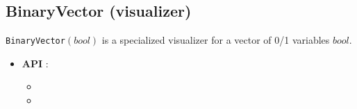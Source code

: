 \subsection{BinaryVector (visualizer)}\label{binaryvector:visu}\hypertarget{binaryvector:visu}{}
\begin{notedef}
  \texttt{BinaryVector}$(bool)$  is a specialized visualizer for a vector of 0/1 variables $bool$.
\end{notedef}

\begin{itemize}
	\item \textbf{API} : 
	\begin{itemize}
	\item {}
	\item {}
	\end{itemize}
\end{itemize}

%

